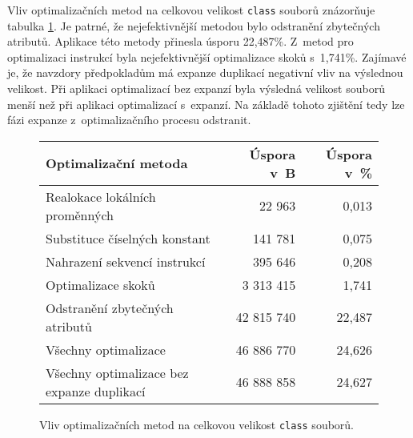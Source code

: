 Vliv optimalizačních metod na celkovou velikost \texttt{class} souborů znázorňuje tabulka \ref{tab:sizes}. Je patrné, že nejefektivnější metodou bylo odstranění zbytečných atributů. Aplikace této metody přinesla úsporu 22,487\%. Z~metod pro optimalizaci instrukcí byla nejefektivnější optimalizace skoků s~1,741\%. Zajímavé je, že navzdory předpokladům má expanze duplikací negativní vliv na výslednou velikost. Při aplikaci optimalizací bez expanzí byla výsledná velikost souborů menší než při aplikaci optimalizací s~expanzí. Na základě tohoto zjištění tedy lze fázi expanze z~optimalizačního procesu odstranit.

\begin{figure}
\begin{center}
  \begin{tabular}{l r r} \hline

\textbf{Optimalizační metoda}	&	\textbf{Úspora v~B}	&	\textbf{Úspora v~\%}	\\\hline
Realokace lokálních proměnných					&	22 963	&			0,013	\\
Substituce číselných konstant					&	141 781	&			0,075	\\
Nahrazení sekvencí instrukcí					&	395 646	&			0,208	\\
Optimalizace skoků					&	3 313 415	&			1,741	\\
Odstranění zbytečných atributů			&	42 815 740			&	22,487			\\
Všechny optimalizace			&	46 886 770			&	24,626			\\
Všechny optimalizace bez expanze duplikací			&	46 888 858			&	24,627			\\\hline

  \end{tabular}
\end{center}
\caption{Vliv optimalizačních metod na celkovou velikost \texttt{class} souborů.}
\label{tab:sizes}
\end{figure}
          
